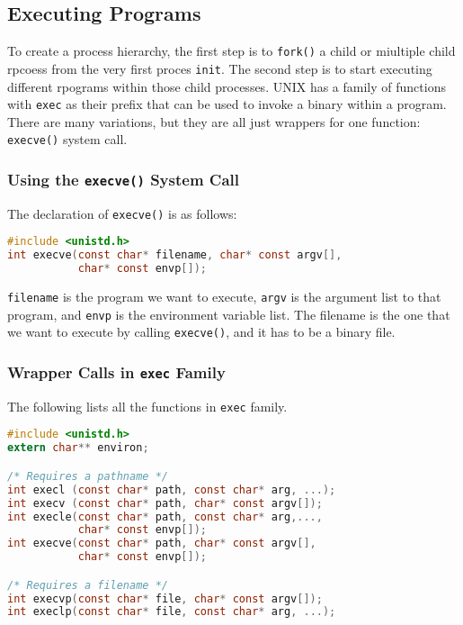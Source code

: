 \documentclass{article}
\newcommand{\code}[1]{\texttt{#1}}
\begin{document}
\subsection{Executing Programs}

To create a process hierarchy, the first step is to \code{fork()} a child or miultiple child rpcoess from the very first proces \code{init}. The second step is to start executing different rpograms within those child processes. UNIX has a family of functions with \code{exec} as their prefix that can be used to invoke a binary within a program. There are many variations, but they are all just wrappers for one function: \code{execve()} system call. 

\subsubsection{Using the \code{execve()} System Call}

The declaration of \code{execve()} is as follows:

\begin{lstlisting}[language=C]
#include <unistd.h>
int execve(const char* filename, char* const argv[],
           char* const envp[]);
\end{lstlisting}

\noindent \code{filename} is the program we want to execute, \code{argv} is the argument list to that program, and \code{envp} is the environment variable list. The filename is the one that we want to execute by calling \code{execve()}, and it has to be a binary file. 

\subsubsection{Wrapper Calls in \code{exec} Family}

The following lists all the functions in \code{exec} family. 

\begin{lstlisting}[language=C]
#include <unistd.h>
extern char** environ;

/* Requires a pathname */
int execl (const char* path, const char* arg, ...);
int execv (const char* path, char* const argv[]);
int execle(const char* path, const char* arg,...,
           char* const envp[]);
int execve(const char* path, char* const argv[],
           char* const envp[]);

/* Requires a filename */
int execvp(const char* file, char* const argv[]);
int execlp(const char* file, const char* arg, ...);
\end{lstlisting}
\end{document}
